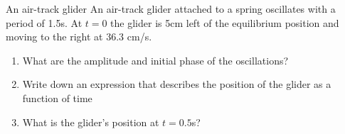 \pagebreak
\begin{examplebox}[width = \pagewidth]{An air-track glider}
An air-track glider attached to a spring oscillates with a period of 1.5s. At $t = 0$ the glider is 5cm left of the equilibrium position and moving to the right at 36.3 cm/s.
\begin{enumerate}[label=(\alph*)]
\item What are the amplitude and initial phase of the oscillations?
\item Write down an expression that describes the position of the glider as a function of time
\item What is the glider's position at $t = 0.5$s?
\end{enumerate}


\end{examplebox}
